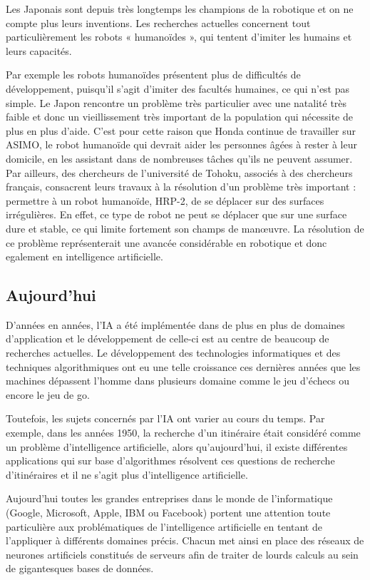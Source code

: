 Les Japonais sont depuis très longtemps les champions de la robotique et on ne compte plus leurs inventions. Les recherches actuelles concernent tout particulièrement les robots « humanoïdes », qui tentent d’imiter les humains et leurs capacités.


Par exemple les robots humanoïdes présentent plus de difficultés de développement, puisqu’il s’agit d’imiter des facultés humaines, ce qui n’est pas simple. Le Japon rencontre un problème très particulier avec une natalité très faible et donc un vieillissement très important de la population qui nécessite de plus en plus d’aide. C’est pour cette raison que Honda continue de travailler sur ASIMO, le robot humanoïde qui devrait aider les personnes âgées à rester à leur domicile, en les assistant dans de nombreuses tâches qu’ils ne peuvent assumer. Par ailleurs, des chercheurs de l’université de Tohoku, associés à des chercheurs français, consacrent leurs travaux à la résolution d’un problème très important : permettre à un robot humanoïde, HRP-2, de se déplacer sur des surfaces irrégulières. En effet, ce type de robot ne peut se déplacer que sur une surface dure et stable, ce qui limite fortement son champs de manœuvre. La résolution de ce problème représenterait une avancée considérable en robotique et donc egalement en intelligence artificielle.




\subsection{Aujourd'hui}

D’années en années, l'IA a été implémentée dans de plus en plus de domaines d'application et le développement de celle-ci est au centre de beaucoup de recherches actuelles. 
Le développement des technologies informatiques et des techniques algorithmiques ont eu une telle croissance ces dernières années que les machines dépassent l’homme dans plusieurs domaine comme le jeu d’échecs ou encore le jeu de go.

Toutefois, les sujets concernés par l’IA ont varier au cours du temps. Par exemple, dans les années 1950, la recherche d'un itinéraire était considéré comme un problème d'intelligence artificielle, alors qu’aujourd’hui, il existe différentes applications qui sur base d’algorithmes résolvent ces questions de recherche d'itinéraires et il ne s’agit plus d’intelligence artificielle.

Aujourd’hui toutes les grandes entreprises dans le monde de l’informatique (Google, Microsoft, Apple, IBM ou Facebook) portent une attention toute particulière aux problématiques de l'intelligence artificielle en tentant de l'appliquer à différents domaines précis. 
Chacun met ainsi en place des réseaux de neurones artificiels constitués de serveurs afin de traiter de lourds calculs au sein de gigantesques bases de données.

